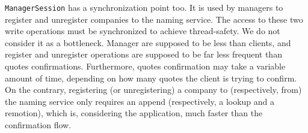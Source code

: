 \texttt{ManagerSession} has a synchronization point too. It is used by managers to register and unregister companies to the naming service. The access to these two write operations must be synchronized to achieve thread-safety. We do not consider it as a bottleneck. Manager are supposed to be less than clients, and register and unregister operations are supposed to be far less frequent than quotes confirmations. Furthermore, quotes confirmation may take a variable amount of time, depending on how many quotes the client is trying to confirm. On the contrary, registering (or unregistering) a company to (respectively, from) the naming service only requires an append (respectively, a lookup and a remotion), which is, considering the application, much faster than the confirmation flow.